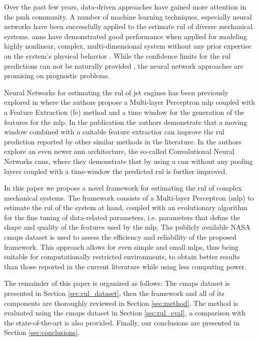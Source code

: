 Over the past few years, data-driven approaches have gained more attention in the \gls{pmh} community. A number of machine learning techniques, especially neural networks have been successfully applied to the estimate \gls{rul} of diverse mechanical systems. \glspl{ann} have demonstrated good performance when applied for modeling highly nonlinear, complex, multi-dimensional system without any prior expertise on the system's physical behavior \cite{Li2018}. While the confidence limits for the \gls{rul} predictions can not be naturally provided \cite{Sikorska2011}, the neural network approaches are promising on prognostic problems.

Neural Networks for estimating the \gls{rul} of jet engines has been previously explored in \cite{Lim2016} where the authors propose a Multi-layer Perceptron \gls{mlp} coupled with a Feature Extraction (\gls{fe}) method and a time window for the generation of the features for the \gls{mlp}. In the publication the authors demonstrate that a moving window combined with a suitable feature extractior can improve the \gls{rul} prediction reported by other similar methods in the literature. In \cite{Li2018} the authors explore an even newer \gls{ann} architecture, the so-called Convolutional Neural Networks \glspl{cnn}, where they demonstrate that by using a \gls{cnn} without any pooling layers coupled with a time-window the predicted \gls{rul} is further improved.

In this paper we propose a novel framework for estimating the \gls{rul} of complex mechanical systems. The framework consists of a Multi-layer Perceptron (\gls{mlp}) to estimate the \gls{rul} of the system at hand, coupled with an evolutionary algorithm for the fine tuning of data-related parameters, i.e. parameters that define the shape and quality of the features used by the \gls{mlp}. The publicly available NASA \gls{cmaps} dataset \cite{CMAPS2008} is used to assess the efficiency and reliability of the proposed framework. This approach allows for even simple and small \glspl{mlp}, thus being suitable for computationally restricted environments, to obtain better results than those reported in the current literature while using less computing power.

The remainder of this paper is organized as follows: The \gls{cmaps} dataset is presented in Section \ref{sec:rul_dataset}, then the framework and all of its components are thoroughly reviewed in Section \ref{sec:method}. The method is evaluated using the \gls{cmaps} dataset in Section \ref{sec:rul_eval}, a comparison with the state-of-the-art is also provided. Finally, our conclusions are presented in Section \ref{sec:conclusions}.